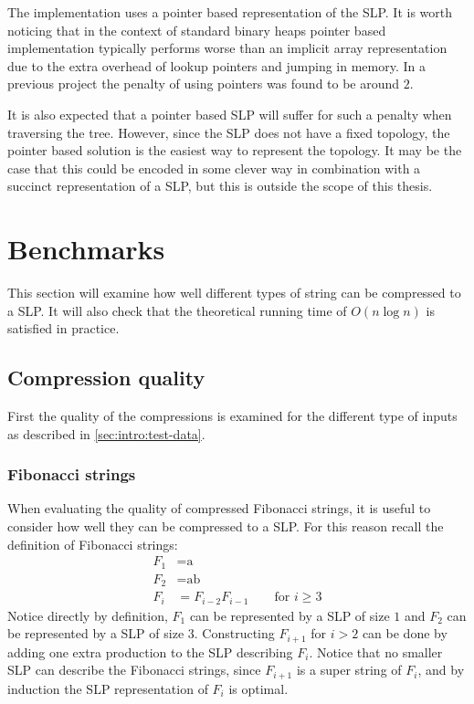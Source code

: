 \documentclass[twoside,11pt,openright]{report}
\begin{document}
The implementation uses a pointer based representation of the SLP. It is worth noticing that in the context of standard binary heaps pointer based implementation typically performs worse than an implicit array representation due to the extra overhead of lookup pointers and jumping in memory. In a previous project \cite[p. 9]{AA13Project1} the penalty of using pointers was found to be around $2$.

It is also expected that a pointer based SLP will suffer for such a penalty when traversing the tree. However, since the SLP does not have a fixed topology, the pointer based solution is the easiest way to represent the topology. It may be the case that this could be encoded in some clever way in combination with a succinct representation of a SLP, but this is outside the scope of this thesis.

\clearpage
\section{Benchmarks}
\label{sec:compression:benchmarks}
This section will examine how well different types of string can be compressed to a SLP. It will also check that the theoretical running time of $O(n\log{n})$ is satisfied in practice.

\subsection{Compression quality}
First the quality of the compressions is examined for the different type of inputs as described in \cref{sec:intro:test-data}.

\subsubsection{Fibonacci strings}
\label{sec:compressing-Fibonacci-strings}
When evaluating the quality of compressed Fibonacci strings, it is useful to consider how well they can be compressed to a SLP. For this reason recall the definition of Fibonacci strings:
\begin{align*}
  F_1 &= \text{a} \\
  F_2 &= \text{ab} \\
  F_{i} &= F_{i - 2} F_{i - 1} \quad\quad \text{for } i \geq 3
\end{align*}
Notice directly by definition, $F_1$ can be represented by a SLP of size $1$ and $F_2$ can be represented by a SLP of size $3$. Constructing $F_{i + 1}$ for $i > 2$ can be done by adding one extra production to the SLP describing $F_{i}$. Notice that no smaller SLP can describe the Fibonacci strings, since $F_{i+1}$ is a super string of $F_i$, and by induction the SLP representation of $F_i$ is optimal.
\end{document}
